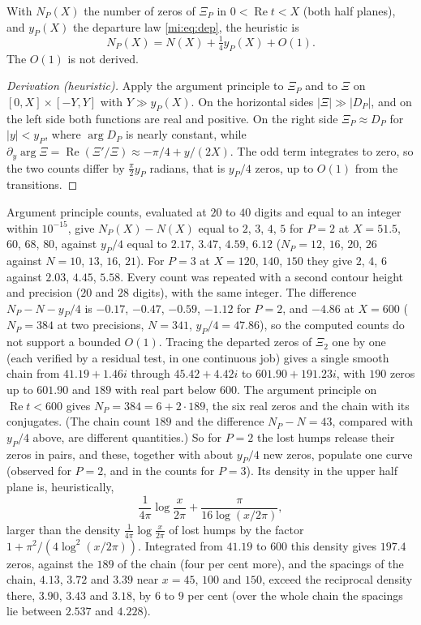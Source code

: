 \begin{remark}\label{mi:prop:zerocount}
With $N_P(X)$ the number of zeros of $\Xi_P$ in $0<\operatorname{Re}t<X$ (both half planes), and $y_P(X)$ the departure law \eqref{mi:eq:dep}, the heuristic is
\[
N_P(X)=N(X)+\tfrac14y_P(X)+O(1).
\]
The $O(1)$ is not derived.
\end{remark}

\begin{proof}[Derivation (heuristic)]
Apply the argument principle to $\Xi_P$ and to $\Xi$ on $[0,X]\times[-Y,Y]$ with $Y\gg y_P(X)$. On the horizontal sides $|\Xi|\gg|D_P|$, and on the left side both functions are real and positive. On the right side $\Xi_P\approx D_P$ for $|y|<y_P$, where $\arg D_P$ is nearly constant, while $\partial_y\arg\Xi=\operatorname{Re}(\Xi'/\Xi)\approx-\pi/4+y/(2X)$. The odd term integrates to zero, so the two counts differ by $\frac\pi2y_P$ radians, that is $y_P/4$ zeros, up to $O(1)$ from the transitions.
\end{proof}

Argument principle counts, evaluated at $20$ to $40$ digits and equal to an integer within $10^{-15}$, give $N_P(X)-N(X)$ equal to $2$, $3$, $4$, $5$ for $P=2$ at $X=51.5$, $60$, $68$, $80$, against $y_P/4$ equal to $2.17$, $3.47$, $4.59$, $6.12$ ($N_P=12$, $16$, $20$, $26$ against $N=10$, $13$, $16$, $21$). For $P=3$ at $X=120$, $140$, $150$ they give $2$, $4$, $6$ against $2.03$, $4.45$, $5.58$. Every count was repeated with a second contour height and precision ($20$ and $28$ digits), with the same integer. The difference $N_P-N-y_P/4$ is $-0.17$, $-0.47$, $-0.59$, $-1.12$ for $P=2$, and $-4.86$ at $X=600$ ($N_P=384$ at two precisions, $N=341$, $y_P/4=47.86$), so the computed counts do not support a bounded $O(1)$. Tracing the departed zeros of $\Xi_2$ one by one (each verified by a residual test, in one continuous job) gives a single smooth chain from $41.19+1.46i$ through $45.42+4.42i$ to $601.90+191.23i$, with $190$ zeros up to $601.90$ and $189$ with real part below $600$. The argument principle on $\operatorname{Re}t<600$ gives $N_P=384=6+2\cdot189$, the six real zeros and the chain with its conjugates. (The chain count $189$ and the difference $N_P-N=43$, compared with $y_P/4$ above, are different quantities.) So for $P=2$ the lost humps release their zeros in pairs, and these, together with about $y_P/4$ new zeros, populate one curve (observed for $P=2$, and in the counts for $P=3$). Its density in the upper half plane is, heuristically,
\[
\frac1{4\pi}\log\frac x{2\pi}+\frac\pi{16\log(x/2\pi)},
\]
larger than the density $\frac1{4\pi}\log\frac x{2\pi}$ of lost humps by the factor $1+\pi^2/(4\log^2(x/2\pi))$. Integrated from $41.19$ to $600$ this density gives $197.4$ zeros, against the $189$ of the chain (four per cent more), and the spacings of the chain, $4.13$, $3.72$ and $3.39$ near $x=45$, $100$ and $150$, exceed the reciprocal density there, $3.90$, $3.43$ and $3.18$, by $6$ to $9$ per cent (over the whole chain the spacings lie between $2.537$ and $4.228$).
